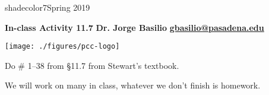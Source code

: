 \documentclass[10pt]{scrartcl} %
\begin{document}
\begin{flushleft}

\begin{head}{shadecolor7}{Spring 2019}
%


\textcolor{jorgegray1}{\textbf{In-class Activity 11.7}} 
	\hfill \textcolor{jorgegray1}{\textbf{Dr. Jorge Basilio}}
\tcbline
\phantom{.}
	\hfill \href{gbasilio@pasadena.edu}{\textbf{gbasilio@pasadena.edu}}
\end{head}

\vspace*{-2.09cm}\texttt{[image: ./figures/pcc-logo]}
\vspace{1.25cm}


{\Huge Do \# 1--38 from \S 11.7 from Stewart's textbook.\vspace{10pt}

We will work on many in class, whatever we don't finish is homework.}


\end{flushleft}
\end{document}
